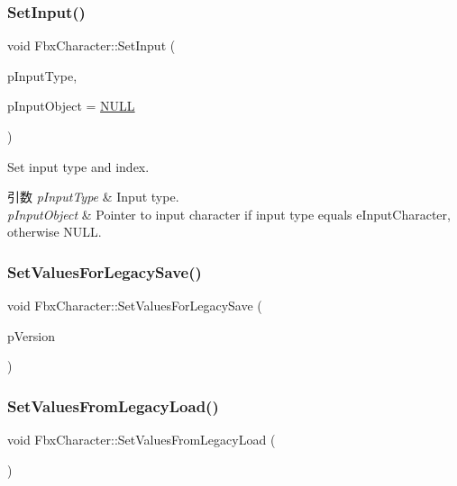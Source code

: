 \subsubsection{\texorpdfstring{Set\+Input()}{SetInput()}}
{\footnotesize\ttfamily void Fbx\+Character\+::\+Set\+Input (\begin{DoxyParamCaption}\item[{\hyperlink{class_fbx_character_a0c2ca4f8cab9c76a83b0e207f3ae8ea1}{E\+Input\+Type}}]{p\+Input\+Type,  }\item[{\hyperlink{class_fbx_object}{Fbx\+Object} $\ast$}]{p\+Input\+Object = {\ttfamily \hyperlink{fbxarch_8h_a070d2ce7b6bb7e5c05602aa8c308d0c4}{N\+U\+LL}} }\end{DoxyParamCaption})}

Set input type and index. 
\begin{DoxyParams}{引数}
{\em p\+Input\+Type} & Input type. \\
\hline
{\em p\+Input\+Object} & Pointer to input character if input type equals e\+Input\+Character, otherwise {\ttfamily N\+U\+LL}. \\
\hline
\end{DoxyParams}
\mbox{\label{class_fbx_character_ae9095a29e0f3f141abe8a9107de87a69}} 
\subsubsection{\texorpdfstring{Set\+Values\+For\+Legacy\+Save()}{SetValuesForLegacySave()}}
{\footnotesize\ttfamily void Fbx\+Character\+::\+Set\+Values\+For\+Legacy\+Save (\begin{DoxyParamCaption}\item[{int}]{p\+Version }\end{DoxyParamCaption})}

\mbox{\label{class_fbx_character_a17b63d788b3105cc2322e6841e5b5c3b}} 
\subsubsection{\texorpdfstring{Set\+Values\+From\+Legacy\+Load()}{SetValuesFromLegacyLoad()}}
{\footnotesize\ttfamily void Fbx\+Character\+::\+Set\+Values\+From\+Legacy\+Load (\begin{DoxyParamCaption}{ }\end{DoxyParamCaption})}

